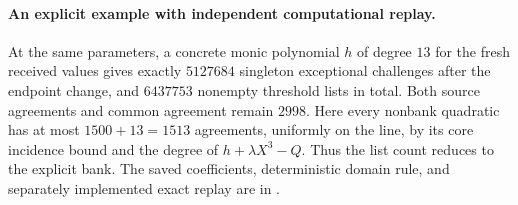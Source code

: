 \paragraph{An explicit example with independent computational replay.}
At the same parameters, a concrete monic polynomial $h$ of degree $13$
for the fresh received values gives exactly $5127684$ singleton exceptional
challenges after the endpoint change, and $6437753$ nonempty threshold
lists in total. Both source agreements and common agreement remain $2998$.
Here every nonbank quadratic has at most $1500+13=1513$ agreements,
uniformly on the line, by its core incidence bound and the degree of
$h+\lambda X^3-Q$. Thus the list count reduces to the explicit bank.
The saved coefficients, deterministic domain rule, and separately
implemented exact replay are in
.
